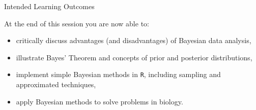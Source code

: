 
\begin{frame}{Intended Learning Outcomes}

        At the end of this session you are now able to:
        \begin{itemize}
                \item critically discuss advantages (and disadvantages) of Bayesian data analysis,
                \item illustrate Bayes' Theorem and concepts of prior and posterior distributions,
                \item implement simple Bayesian methods in \texttt{R}, including sampling and approximated techniques,
                \item apply Bayesian methods to solve problems in biology.
        \end{itemize}

\end{frame}














